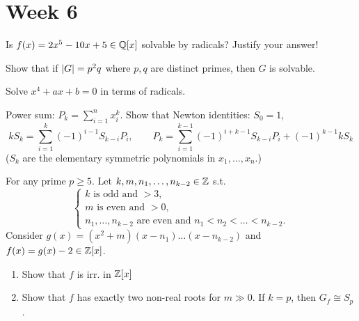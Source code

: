
\section{Week 6}

\begin{exercise}
  Is $f(x) = 2x^5 - 10x + 5 \in \mathbb{Q}[x]$ solvable by radicals? Justify your
  answer!
\end{exercise}

\begin{exercise}
  Show that if $\lvert G\rvert = p^2 q$ where $p, q$ are distinct primes, then
  $G$ is solvable.
\end{exercise}

\begin{exercise}
  Solve $x^4 + ax + b = 0$ in terms of radicals.
\end{exercise}

\begin{exercise}
  Power sum: $\displaystyle P_k = \sum_{i=1}^n x_i^k$.
  Show that Newton identities: $S_0 = 1$,
  \[
    kS_k = \sum_{i=1}^k (-1)^{i-1} S_{k-i}P_i, \qquad
    P_k = \sum_{i=1}^{k-1}(-1)^{i+k-1} S_{k-i}P_i + (-1)^{k-1}kS_k
  \]
  ($S_k$ are the elementary symmetric polynomials in $x_1, \dots, x_n$.)
\end{exercise}

\begin{exercise}
  For any prime $p \ge 5$.
  Let $k, m, n_1, \dots, n_{k-2} \in \mathbb{Z}$ s.t.
  \[
    \begin{cases}
      k \text{~is odd and~} > 3, \\
      m \text{~is even and~} > 0, \\
      n_1, \dots, n_{k-2} \text{~are even and~} n_1 < n_2 < \dots < n_{k-2}.
    \end{cases}
  \]
  Consider $g(x) = (x^2+m)(x-n_1)\dots(x-n_{k-2})$ and
  $f(x) = g(x)-2 \in \mathbb{Z}[x]$.
  \begin{enumerate}
    \item Show that $f$ is irr. in $\mathbb{Z}[x]$
    \item Show that $f$ has exactly two non-real roots for $m \gg 0$.
      If $k = p$, then $G_f \cong S_p$.
  \end{enumerate}
\end{exercise}
